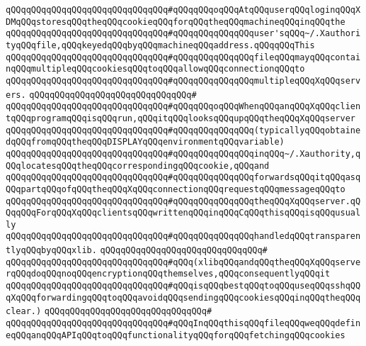 \verb|qQQqqQQqqQQqqQQqqQQqqQQqqQQqqQQq#qQQqqQQqoqQQqAtqQQquserqQQqloginqQQqXDMqQQqstoresqQQqtheqQQqcookieqQQqforqQQqtheqQQqmachineqQQqinqQQqthe|\newline
\verb|qQQqqQQqqQQqqQQqqQQqqQQqqQQqqQQq#qQQqqQQqqQQqqQQquser'sqQQq~/.XauthorityqQQqfile,qQQqkeyedqQQqbyqQQqmachineqQQqaddress.qQQqqQQqThis|\newline
\verb|qQQqqQQqqQQqqQQqqQQqqQQqqQQqqQQq#qQQqqQQqqQQqqQQqfileqQQqmayqQQqcontainqQQqmultipleqQQqcookiesqQQqtoqQQqallowqQQqconnectionqQQqto|\newline
\verb|qQQqqQQqqQQqqQQqqQQqqQQqqQQqqQQq#qQQqqQQqqQQqqQQqmultipleqQQqXqQQqservers.|\newline
\verb|qQQqqQQqqQQqqQQqqQQqqQQqqQQqqQQq#|\newline
\verb|qQQqqQQqqQQqqQQqqQQqqQQqqQQqqQQq#qQQqqQQqoqQQqWhenqQQqanqQQqXqQQqclientqQQqprogramqQQqisqQQqrun,qQQqitqQQqlooksqQQqupqQQqtheqQQqXqQQqserver|\newline
\verb|qQQqqQQqqQQqqQQqqQQqqQQqqQQqqQQq#qQQqqQQqqQQqqQQq(typicallyqQQqobtainedqQQqfromqQQqtheqQQqDISPLAYqQQqenvironmentqQQqvariable)|\newline
\verb|qQQqqQQqqQQqqQQqqQQqqQQqqQQqqQQq#qQQqqQQqqQQqqQQqinqQQq~/.Xauthority,qQQqlocatesqQQqtheqQQqcorrespondingqQQqcookie,qQQqand|\newline
\verb|qQQqqQQqqQQqqQQqqQQqqQQqqQQqqQQq#qQQqqQQqqQQqqQQqforwardsqQQqitqQQqasqQQqpartqQQqofqQQqtheqQQqXqQQqconnectionqQQqrequestqQQqmessageqQQqto|\newline
\verb|qQQqqQQqqQQqqQQqqQQqqQQqqQQqqQQq#qQQqqQQqqQQqqQQqtheqQQqXqQQqserver.qQQqqQQqForqQQqXqQQqclientsqQQqwrittenqQQqinqQQqCqQQqthisqQQqisqQQqusually|\newline
\verb|qQQqqQQqqQQqqQQqqQQqqQQqqQQqqQQq#qQQqqQQqqQQqqQQqhandledqQQqtransparentlyqQQqbyqQQqxlib.|\newline
\verb|qQQqqQQqqQQqqQQqqQQqqQQqqQQqqQQq#|\newline
\verb|qQQqqQQqqQQqqQQqqQQqqQQqqQQqqQQq#qQQq(xlibqQQqandqQQqtheqQQqXqQQqserverqQQqdoqQQqnoqQQqencryptionqQQqthemselves,qQQqconsequentlyqQQqit|\newline
\verb|qQQqqQQqqQQqqQQqqQQqqQQqqQQqqQQq#qQQqisqQQqbestqQQqtoqQQquseqQQqsshqQQqXqQQqforwardingqQQqtoqQQqavoidqQQqsendingqQQqcookiesqQQqinqQQqtheqQQqclear.)|\newline
\verb|qQQqqQQqqQQqqQQqqQQqqQQqqQQqqQQq#|\newline
\verb|qQQqqQQqqQQqqQQqqQQqqQQqqQQqqQQq#qQQqInqQQqthisqQQqfileqQQqweqQQqdefineqQQqanqQQqAPIqQQqtoqQQqfunctionalityqQQqforqQQqfetchingqQQqcookies|\newline
